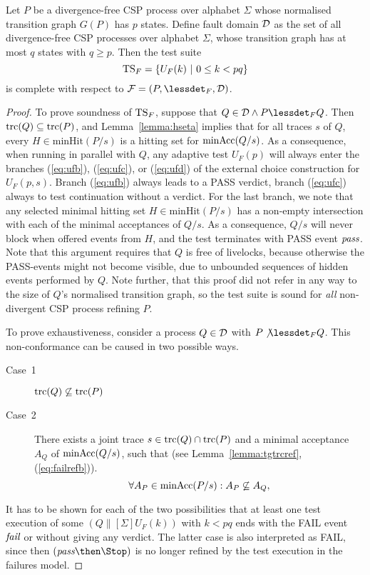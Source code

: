 \begin{theorem}\label{th:failurestest}
Let $P$ be a divergence-free CSP process over alphabet $\Sigma$ 
whose normalised transition graph $G(P)$ has $p$ states. Define fault domain ${\cal D}$ as
the set of all divergence-free CSP processes over alphabet $\Sigma$, whose transition graph
has at most $q$ states with $q \ge p$. 
Then the test suite 
\[
{\text{TS}}_F = \{ U_F(k)~|~0 \le k < pq  \}
\]
is complete with respect to ${\cal F} = (P,\lessdet_F,{\cal D})$.
\end{theorem}
\begin{proof}
To prove soundness of ${\text{TS}}_F$, suppose that $Q\in{\cal D} \wedge P\lessdet_F Q$. Then
$\text{trc}(Q)\subseteq \text{trc}(P)$, and Lemma~\ref{lemma:hseta} implies that 
for all traces $s$ of $Q$, every $H\in\text{minHit}(P/s)$ is a 
    hitting set for $\text{minAcc}(Q/s)$. As a consequence, when running in parallel
with $Q$, any adaptive test $U_F(p)$ will always enter the branches 
(\ref{eq:ufb}), (\ref{eq:ufc}),  or (\ref{eq:ufd}) of the external choice construction
for $U_F(p,s)$. Branch (\ref{eq:ufb}) always leads to a PASS verdict, branch (\ref{eq:ufc})
always to test continuation without a verdict. For the last branch, we note that 
any selected minimal hitting set $H\in\text{minHit}(P/s)$ has a non-empty intersection with
each of the minimal acceptances of $Q/s$. As a consequence, $Q/s$ will never block when offered events from $H$, and the test terminates with PASS event ${\text{\it pass}}$. Note that this argument requires that $Q$ is free of livelocks, because otherwise the PASS-events might not become visible, due to unbounded sequences of hidden events performed by $Q$. Note further, that this proof did not refer in any way to the size of $Q$'s normalised transition graph, so the test suite is sound for {\it all} non-divergent CSP process refining $P$.

To prove exhaustiveness, consider a process $Q\in{\cal D}$ with $P\not\lessdet_F Q$. This non-conformance can be caused in two possible ways.
\begin{description}
\item[Case~1] $\text{trc}(Q)\not\subseteq \text{trc}(P)$
\item[Case~2] There exists a joint trace $s\in\text{trc}(Q)\cap\text{trc}(P)$ and a minimal acceptance $A_Q$
of $\text{minAcc}(Q/s)$, such that 
(see Lemma~\ref{lemma:tgtrcref}, (\ref{eq:failrefb})).
\begin{equation}
\label{eq:accsnotcontained}
\forall A_P\in\text{minAcc}(P/s): A_P\not\subseteq A_Q,
\end{equation} 
\end{description}
It has to be shown for each of the two possibilities that at least one test execution of some $(Q\parallel[\Sigma] U_F(k))$ with $k < pq$ ends with the FAIL event ${\text{\it fail}}$ or without giving any verdict. The latter case is also interpreted   as FAIL, since then  
$(\epass\then\Stop)$ is no longer refined by the test execution in the failures model.


\end{proof}
